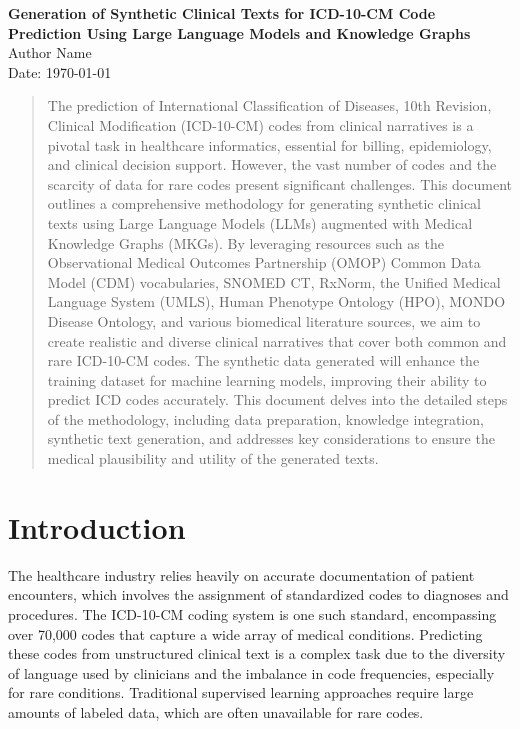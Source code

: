 \documentclass[12pt, a4paper]{article}
\begin{document}
\begin{center}
    {\Large \textbf{Generation of Synthetic Clinical Texts for ICD-10-CM Code Prediction Using Large Language Models and Knowledge Graphs}}\\[1.5cm]
    {\large Author Name}\\
    {\large Date: \today}
\end{center}

\vspace{1.5cm}

\begin{abstract}
The prediction of International Classification of Diseases, 10th Revision, Clinical Modification (ICD-10-CM) codes from clinical narratives is a pivotal task in healthcare informatics, essential for billing, epidemiology, and clinical decision support. However, the vast number of codes and the scarcity of data for rare codes present significant challenges. This document outlines a comprehensive methodology for generating synthetic clinical texts using Large Language Models (LLMs) augmented with Medical Knowledge Graphs (MKGs). By leveraging resources such as the Observational Medical Outcomes Partnership (OMOP) Common Data Model (CDM) vocabularies, SNOMED CT, RxNorm, the Unified Medical Language System (UMLS), Human Phenotype Ontology (HPO), MONDO Disease Ontology, and various biomedical literature sources, we aim to create realistic and diverse clinical narratives that cover both common and rare ICD-10-CM codes. The synthetic data generated will enhance the training dataset for machine learning models, improving their ability to predict ICD codes accurately. This document delves into the detailed steps of the methodology, including data preparation, knowledge integration, synthetic text generation, and addresses key considerations to ensure the medical plausibility and utility of the generated texts.
\end{abstract}

\newpage

\tableofcontents

\newpage

\section{Introduction}

The healthcare industry relies heavily on accurate documentation of patient encounters, which involves the assignment of standardized codes to diagnoses and procedures. The ICD-10-CM coding system is one such standard, encompassing over 70,000 codes that capture a wide array of medical conditions. Predicting these codes from unstructured clinical text is a complex task due to the diversity of language used by clinicians and the imbalance in code frequencies, especially for rare conditions. Traditional supervised learning approaches require large amounts of labeled data, which are often unavailable for rare codes.
\end{document}
